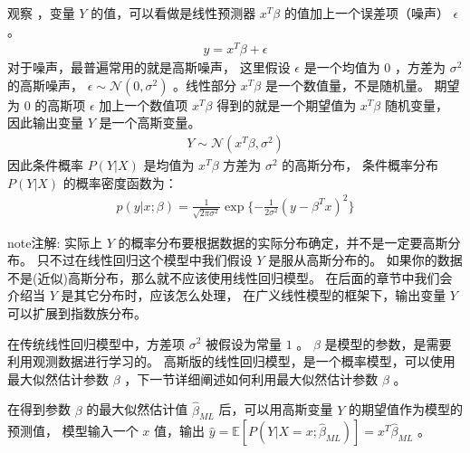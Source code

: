 \documentclass[letterpaper,10pt,english]{sphinxmanual}
\begin{document}
观察 
，变量 \(Y\) 的值，可以看做是线性预测器 \(x^T \beta\) 的值加上一个误差项（噪声）
\(\epsilon\) 。
\begin{equation}\label{equation:线性回归/content:线性回归/content:7}
\begin{split}y=x^T \beta + \epsilon\end{split}
\end{equation}
对于噪声，最普遍常用的就是高斯噪声，
这里假设 \(\epsilon\) 是一个均值为 \(0\)
，方差为 \(\sigma^2\) 的高斯噪声，
\(\epsilon \sim \mathcal{N}(0,\sigma^2)\)
。线性部分 \(x^T \beta\)
是一个数值量，不是随机量。
期望为 \(0\) 的高斯项 \(\epsilon\) 加上一个数值项 \(x^T \beta\)
得到的就是一个期望值为 \(x^T \beta\) 随机变量，
因此输出变量 \(Y\) 是一个高斯变量。
\begin{equation}\label{equation:线性回归/content:线性回归/content:8}
\begin{split}Y \sim \mathcal{N}(x^T \beta,\sigma^2)\end{split}
\end{equation}
因此条件概率 \(P(Y|X)\) 是均值为 \(x^T \beta\) 方差为 \(\sigma^2\)
的高斯分布，
条件概率分布 \(P(Y|X)\) 的概率密度函数为：
\begin{equation}\label{equation:线性回归/content:eq_29_10}
\begin{split}p(y|x;\beta) = \frac{1}{\sqrt{2\pi\sigma^2}} \exp \{ -\frac{1}{2\sigma^2}(y-\beta^Tx)^2 \}\end{split}
\end{equation}
\begin{sphinxadmonition}{note}{注解:}
实际上 \(Y\) 的概率分布要根据数据的实际分布确定，并不是一定要高斯分布。
只不过在线性回归这个模型中我们假设 \(Y\) 是服从高斯分布的。
如果你的数据不是(近似)高斯分布，那么就不应该使用线性回归模型。
在后面的章节中我们会介绍当 \(Y\) 是其它分布时，应该怎么处理，
在广义线性模型的框架下，输出变量 \(Y\) 可以扩展到指数族分布。
\end{sphinxadmonition}

在传统线性回归模型中，方差项 \(\sigma^2\) 被假设为常量 \(1\) 。
\(\beta\) 是模型的参数，是需要利用观测数据进行学习的。
高斯版的线性回归模型，是一个概率模型，可以使用最大似然估计参数 \(\beta\)
，下一节详细阐述如何利用最大似然估计参数 \(\beta\) 。

在得到参数 \(\beta\) 的最大似然估计值 \(\hat{\beta}_{ML}\)
后，可以用高斯变量 \(Y\) 的期望值作为模型的预测值，
模型输入一个 \(x\) 值，输出
\(\hat{y}=\mathbb{E}[P(Y|X=x;\hat{\beta}_{ML})]=x^T \hat{\beta}_{ML}\)
。
\end{document}
